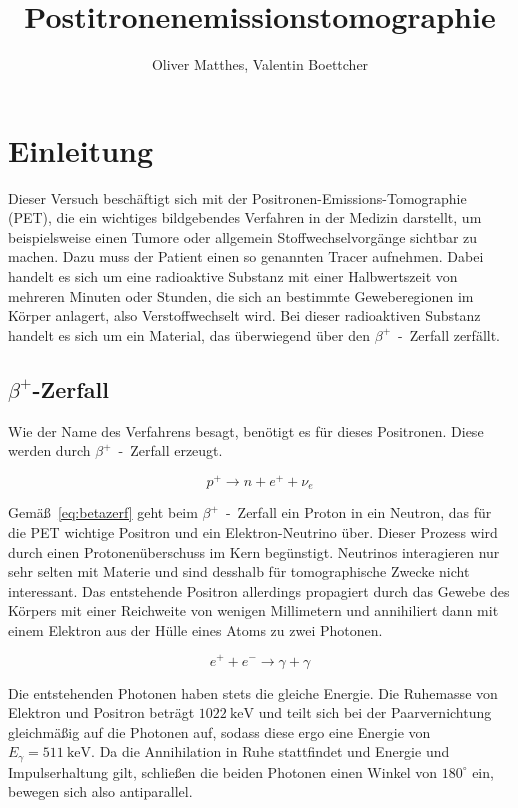 \documentclass[slug=PET, room=Andreas-Schubert-Bau\,\ 424A,
supervisor=Carsten\ Bittrich, coursedate=10.\ 01.\ 2020, ngerman]{../../Lab_Report_LaTeX/lab_report}
\title{Postitronenemissionstomographie}
\author{Oliver Matthes, Valentin Boettcher}
\begin{document}
\maketitle

\section{Einleitung}
\label{sec:einl}

Dieser Versuch beschäftigt sich mit der
Positronen-Emissions-Tomographie (PET), die ein wichtiges bildgebendes
Verfahren in der Medizin darstellt, um beispielsweise einen Tumore
oder allgemein Stoffwechselvorgänge sichtbar zu machen.  Dazu muss der
Patient einen so genannten Tracer aufnehmen. Dabei handelt es sich um
eine radioaktive Substanz mit einer Halbwertszeit von mehreren Minuten
oder Stunden, die sich an bestimmte Geweberegionen im Körper anlagert,
also Verstoffwechselt wird. Bei dieser radioaktiven Substanz handelt
es sich um ein Material, das überwiegend über den
\(\beta^+\)~-~Zerfall zerfällt.

\subsection{\(\beta^+\)-Zerfall}
\label{sec:betazerf}

Wie der Name des Verfahrens besagt, benötigt es für dieses
Positronen. Diese werden durch \(\beta^+\)~-~Zerfall erzeugt.

\begin{equation}\label{eq:betazerf}
        p^+ \rightarrow n + e^+ + \nu_e
\end{equation}

Gem\"a\ss{}~\eqref{eq:betazerf} geht beim \(\beta^+\)~-~Zerfall ein
Proton in ein Neutron, das für die PET wichtige Positron und ein
Elektron-Neutrino \"uber. Dieser Prozess wird durch einen
Protonen\"uberschuss im Kern beg\"unstigt.  Neutrinos interagieren nur
sehr selten mit Materie und sind desshalb f\"ur tomographische Zwecke
nicht interessant. Das entstehende Positron allerdings propagiert
durch das Gewebe des Körpers mit einer Reichweite von wenigen
Millimetern und annihiliert dann mit einem Elektron aus der Hülle
eines Atoms zu zwei Photonen.

\begin{equation}\label{eq:annihi}
        e^+ + e^- \rightarrow \gamma + \gamma
\end{equation}

Die entstehenden Photonen haben stets die gleiche Energie. Die Ruhemasse von Elektron und Positron
beträgt \(\SI{1022}{\kilo\electronvolt}\) und teilt sich bei der Paarvernichtung gleichmäßig auf
die Photonen auf, sodass diese ergo eine Energie von \(E_\gamma = \SI{511}{\kilo\electronvolt}\).
Da die Annihilation in Ruhe stattfindet und Energie und Impulserhaltung gilt, schließen die beiden
Photonen einen Winkel von \(180^\circ\) ein, bewegen sich also antiparallel.\\
\end{document}
